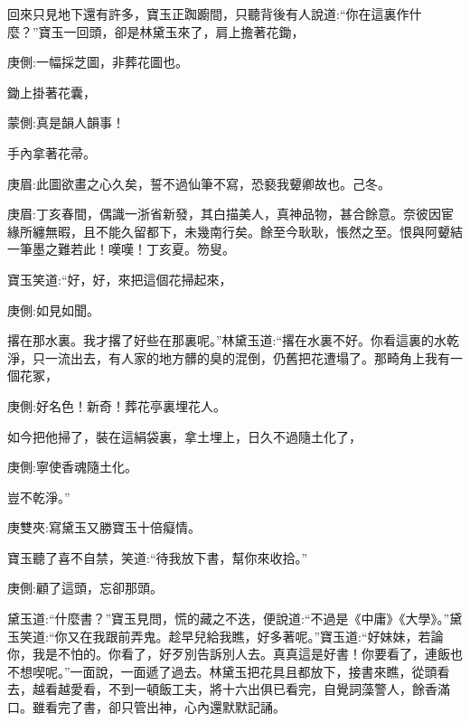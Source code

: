 \begin{parag}
    回來只見地下還有許多，寶玉正踟躕間，只聽背後有人說道:“你在這裏作什麼？”寶玉一回頭，卻是林黛玉來了，肩上擔著花鋤，\begin{note}庚側:一幅採芝圖，非葬花圖也。\end{note}鋤上掛著花囊，\begin{note}蒙側:真是韻人韻事！\end{note}手內拿著花帚。\begin{note}庚眉:此圖欲畫之心久矣，誓不過仙筆不寫，恐褻我顰卿故也。己冬。\end{note}\begin{note}庚眉:丁亥春間，偶識一浙省新發，其白描美人，真神品物，甚合餘意。奈彼因宦緣所纏無暇，且不能久留都下，未幾南行矣。餘至今耿耿，悵然之至。恨與阿顰結一筆墨之難若此！嘆嘆！丁亥夏。笏叟。\end{note}寶玉笑道:“好，好，來把這個花掃起來，\begin{note}庚側:如見如聞。\end{note}撂在那水裏。我才撂了好些在那裏呢。”林黛玉道:“撂在水裏不好。你看這裏的水乾淨，只一流出去，有人家的地方髒的臭的混倒，仍舊把花遭塌了。那畸角上我有一個花冢，\begin{note}庚側:好名色！新奇！葬花亭裏埋花人。\end{note}如今把他掃了，裝在這絹袋裏，拿土埋上，日久不過隨土化了，\begin{note}庚側:寧使香魂隨土化。\end{note}豈不乾淨。”\begin{note}庚雙夾:寫黛玉又勝寶玉十倍癡情。\end{note}寶玉聽了喜不自禁，笑道:“待我放下書，幫你來收拾。”\begin{note}庚側:顧了這頭，忘卻那頭。\end{note}黛玉道:“什麼書？”寶玉見問，慌的藏之不迭，便說道:“不過是《中庸》《大學》。”黛玉笑道:“你又在我跟前弄鬼。趁早兒給我瞧，好多著呢。”寶玉道:“好妹妹，若論你，我是不怕的。你看了，好歹別告訴別人去。真真這是好書！你要看了，連飯也不想喫呢。”一面說，一面遞了過去。林黛玉把花具且都放下，接書來瞧，從頭看去，越看越愛看，不到一頓飯工夫，將十六出俱已看完，自覺詞藻警人，餘香滿口。雖看完了書，卻只管出神，心內還默默記誦。
\end{parag}


